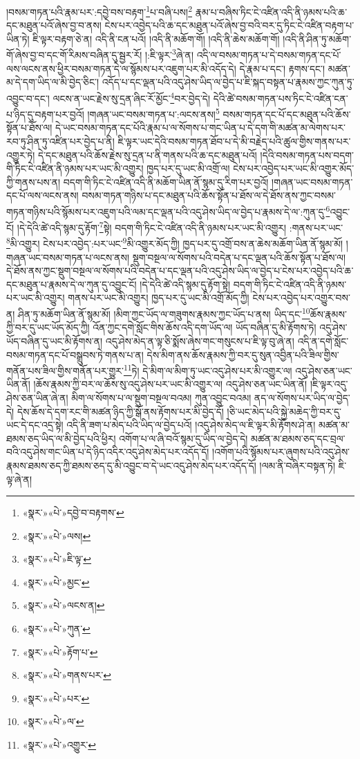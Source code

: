 །བསམ་གཏན་པའི་རྣམ་པར་:དབྱེ་བས་བརྟག་\footnote{«སྣར་»«པེ་»དབྱེ་བ་བརྟགས་}པ་བཞི་པས།\footnote{«སྣར་»«པེ་»ལས།} རྣམ་པ་བཞིས་ཏིང་ངེ་འཛིན་འདི་ནི་ཉམས་པའི་ཆ་དང་མཐུན་པའོ་ཞེས་བྱ་བ་ནས། ངེས་པར་འབྱེད་པའི་ཆ་དང་མཐུན་པའོ་ཞེས་བྱ་བའི་བར་དུ་ཏིང་ངེ་འཛིན་བརྟག་པ་ཡིན་ཏེ། ཇི་ལྟར་བརྟག་ཅེ་ན། འདི་ནི་ངན་པའོ། །འདི་ནི་མཆོག་གོ། །འདི་ནི་ཆེས་མཆོག་གོ། །འདི་ནི་ཤིན་ཏུ་མཆོག་གོ་ཞེས་བྱ་བ་དང་གོ་རིམས་བཞིན་དུ་སྦྱར་རོ། །:ཇི་ལྟར་\footnote{«སྣར་»«པེ་»ཇི་ལྟ་}ཞེ་ན། འདི་ལ་བསམ་གཏན་པ་དེ་བསམ་གཏན་དང་པོ་ལས་ལངས་ནས་ཕྱིར་བསམ་གཏན་དེ་ལ་སྙོམས་པར་འཇུག་པར་མི་འདོད་དེ། དེ་རྣམ་པ་དང་། རྟགས་དང་། མཚན་མ་དེ་དག་ཡིད་ལ་མི་བྱེད་ཅིང་། འདོད་པ་དང་ལྡན་པའི་འདུ་ཤེས་ཡིད་ལ་བྱེད་པ་ཇི་སྐད་བསྟན་པ་རྣམས་ཀྱང་ཀུན་ཏུ་འབྱུང་བ་དང་། ལངས་ན་ཡང་རྗེས་སུ་དྲན་ཞིང་རོ་མྱོང་\footnote{«སྣར་»«པེ་»མྱང་}བར་བྱེད་དེ། དེའི་ཚེ་བསམ་གཏན་པས་ཏིང་ངེ་འཛིན་ངན་པ་ཉིད་དུ་བརྟག་པར་བྱའོ། །གཞན་ཡང་བསམ་གཏན་པ་:ལངས་ནས།\footnote{«སྣར་»«པེ་»ལངས་ན།} བསམ་གཏན་དང་པོ་དང་མཐུན་པའི་ཆོས་སྟོན་པ་ཐོས་ལ། དེ་ཡང་བསམ་གཏན་དང་པོའི་རྣམ་པ་ལ་སོགས་པ་གང་ཡིན་པ་དེ་དག་གི་མཚན་མ་ལེགས་པར་རབ་ཏུ་ཤིན་ཏུ་འཛིན་པར་བྱེད་པ་ནི། ཇི་ལྟར་ཡང་དེའི་བསམ་གཏན་ཐོབ་པ་དེ་མི་བརྗེད་པའི་ཚུལ་གྱིས་གནས་པར་འགྱུར་ཏེ། དེ་དང་མཐུན་པའི་ཆོས་རྗེས་སུ་དྲན་པ་ནི་གནས་པའི་ཆ་དང་མཐུན་པའོ། །དེའི་བསམ་གཏན་པས་བདག་གི་ཏིང་ངེ་འཛིན་ནི་ཉམས་པར་ཡང་མི་འགྱུར། ཁྱད་པར་དུ་ཡང་མི་འགྲོ་ལ། ངེས་པར་འབྱེད་པར་ཡང་མི་འགྱུར་མོད་ཀྱི་གནས་པས་ན། བདག་གི་ཏིང་ངེ་འཛིན་འདི་ནི་མཆོག་ཡིན་ནོ་སྙམ་དུ་རིག་པར་བྱའོ། །གཞན་ཡང་བསམ་གཏན་དང་པོ་ལས་ལངས་ནས། བསམ་གཏན་གཉིས་པ་དང་མཐུན་པའི་ཆོས་སྟོན་པ་ཐོས་ལ་དེ་ཐོས་ནས་ཀྱང་བསམ་གཏན་གཉིས་པའི་སྙོམས་པར་འཇུག་པའི་ལམ་དང་ལྡན་པའི་འདུ་ཤེས་ཡིད་ལ་བྱེད་པ་རྣམས་དེ་ལ་:ཀུན་དུ་\footnote{«སྣར་»«པེ་»ཀུན་}འབྱུང་ངོ། །དེ་དེའི་ཚེ་འདི་སྙམ་དུ་རྟོག་\footnote{«སྣར་»«པེ་»རྟོག་པ་}སྟེ། བདག་གི་ཏིང་ངེ་འཛིན་འདི་ནི་ཉམས་པར་ཡང་མི་འགྱུར། :གནས་པར་ཡང་\footnote{«སྣར་»«པེ་»གནས་པར་}མི་འགྱུར། ངེས་པར་འབྱེད་:པར་ཡང་\footnote{«སྣར་»«པེ་»པར་}མི་འགྱུར་མོད་ཀྱི། ཁྱད་པར་དུ་འགྲོ་བས་ན་ཆེས་མཆོག་ཡིན་ནོ་སྙམ་མོ། །གཞན་ཡང་བསམ་གཏན་པ་ལངས་ནས། སྡུག་བསྔལ་ལ་སོགས་པའི་བདེན་པ་དང་ལྡན་པའི་ཆོས་སྟོན་པ་ཐོས་ལ། དེ་ཐོས་ནས་ཀྱང་སྡུག་བསྔལ་ལ་སོགས་པའི་བདེན་པ་དང་ལྡན་པའི་འདུ་ཤེས་ཡིད་ལ་བྱེད་པ་ངེས་པར་འབྱེད་པའི་ཆ་དང་མཐུན་པ་རྣམས་དེ་ལ་ཀུན་དུ་འབྱུང་ངོ། །དེ་དེའི་ཚེ་འདི་སྙམ་དུ་རྟོག་སྟེ། བདག་གི་ཏིང་ངེ་འཛིན་འདི་ནི་ཉམས་པར་ཡང་མི་འགྱུར། གནས་པར་ཡང་མི་འགྱུར། ཁྱད་པར་དུ་ཡང་མི་འགྲོ་མོད་ཀྱི། ངེས་པར་འབྱེད་པར་འགྱུར་བས་ན། ཤིན་ཏུ་མཆོག་ཡིན་ནོ་སྙམ་མོ། །མིག་ཀྱང་ཡོད་ལ་གཟུགས་རྣམས་ཀྱང་ཡོད་པ་ནས། ཡིད་དང་\footnote{«སྣར་»«པེ་»ལ་}ཆོས་རྣམས་ཀྱི་བར་དུ་ཡང་ཡོད་མོད་ཀྱི། འོན་ཀྱང་དགེ་སློང་གིས་ཆོས་འདི་དག་ཡོད་ལ། ཡོད་བཞིན་དུ་མི་རྟོགས་ཏེ། འདུ་ཤེས་ཡོད་བཞིན་དུ་ཡང་མི་རྟོགས་ན། འདུ་ཤེས་མེད་ན་ལྟ་ཅི་སྨོས་ཞེས་གང་གསུངས་པ་ཇི་ལྟ་བུ་ཞེ་ན། འདི་ན་དགེ་སློང་བསམ་གཏན་དང་པོ་བསྒྲུབས་ཏེ་གནས་པ་ན། དེས་མིག་ནས་ཆོས་རྣམས་ཀྱི་བར་དུ་སུན་འབྱིན་པའི་ཟིལ་གྱིས་གནོན་པས་ཟིལ་གྱིས་གནོན་པར་གྱུར་\footnote{«སྣར་»«པེ་»འགྱུར་}ཏེ། དེ་མིག་ལ་མིག་ཏུ་ཡང་འདུ་ཤེས་པར་མི་འགྱུར་ལ། འདུ་ཤེས་ཅན་ཡང་ཡིན་ནོ། །ཆོས་རྣམས་ཀྱི་བར་ལ་ཆོས་སུ་འདུ་ཤེས་པར་ཡང་མི་འགྱུར་ལ། འདུ་ཤེས་ཅན་ཡང་ཡིན་ནོ། །ཇི་ལྟར་འདུ་ཤེས་ཅན་ཡིན་ཞེ་ན། མིག་ལ་སོགས་པ་ལ་སྡུག་བསྔལ་བའམ། ཀུན་འབྱུང་བའམ། ནད་ལ་སོགས་པར་ཡིད་ལ་བྱེད་དེ། དེས་ཆོས་དེ་དག་རང་གི་མཚན་ཉིད་ཀྱི་སྒོ་ནས་རྟོགས་པར་མི་བྱེད་དོ། །ཅི་ཡང་མེད་པའི་སྐྱེ་མཆེད་ཀྱི་བར་དུ་ཡང་དེ་དང་འདྲ་སྟེ། འདི་ནི་ཟག་པ་མེད་པའི་ཡིད་ལ་བྱེད་པའོ། །འདུ་ཤེས་མེད་ལ་ཇི་ལྟར་མི་རྟོགས་ཤེ་ན། མཚན་མ་ཐམས་ཅད་ཡིད་ལ་མི་བྱེད་པའི་ཕྱིར། འགོག་པ་ལ་ཞི་བའོ་སྙམ་དུ་ཡིད་ལ་བྱེད་དེ། མཚན་མ་ཐམས་ཅད་དང་བྲལ་བའི་འདུ་ཤེས་གང་ཡིན་པ་དེ་ཉིད་འདིར་འདུ་ཤེས་མེད་པར་འདོད་དོ། །འགོག་པའི་སྙོམས་པར་ཞུགས་པའི་འདུ་ཤེས་རྣམས་ཐམས་ཅད་ཀྱི་ཐམས་ཅད་དུ་མི་འབྱུང་བ་དེ་ཡང་འདུ་ཤེས་མེད་པར་འདོད་དོ། །ལམ་ནི་བཞིར་བསྟན་ཏེ། ཇི་ལྟ་ཞེ་ན། 